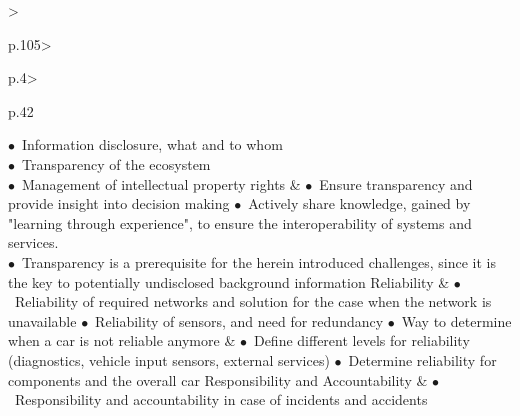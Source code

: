 \begin{table}[t]
\begin{small}
\begin{supertabular}{%
		>{\raggedright}p{.105\textwidth}>{\raggedright}p{.4\textwidth}>{\raggedright}p{.42\textwidth}}
				\noindent $\bullet$~Information disclosure, what and to whom\\
				\noindent $\bullet$~Transparency of the ecosystem\\
				\noindent $\bullet$~Management of intellectual property rights
			& 
				\noindent $\bullet$~Ensure transparency and provide insight into decision making
				\noindent $\bullet$~Actively share knowledge, gained by "learning through experience", to ensure the interoperability of systems and services.\\
				\noindent $\bullet$~Transparency is a prerequisite for the herein introduced challenges, since it is the key to potentially undisclosed background information
 			 \tabularnewline \hline %
			Reliability & 
				\noindent $\bullet$~Reliability of required networks and solution for the case when the network is unavailable
				\noindent $\bullet$~Reliability of sensors, and need for redundancy
				\noindent $\bullet$~Way to determine when a car is not reliable anymore
			& 
				\noindent $\bullet$~Define different levels for reliability (diagnostics, vehicle input sensors, external services)
				\noindent $\bullet$~Determine reliability for components and the overall car
 			 \tabularnewline \hline %
			Responsibility and Accountability & 
				\noindent $\bullet$~Responsibility and accountability in case of incidents and accidents\\

\end{supertabular}
\end{small}
\end{table}
